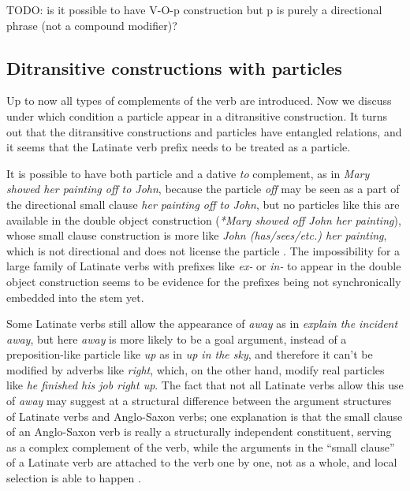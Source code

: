 \documentclass[UTF8, a4paper, oneside, scheme=plain, 12pt]{ctexbook}
\newcommand{\form}[1]{\emph{#1}}
\begin{document}
TODO: is it possible to have V-O-p construction but p is purely a directional phrase (not a compound modifier)?

\subsection{Ditransitive constructions with particles}\label{sec:clause.ditransitive-particle}

Up to now all types of complements of the verb are introduced.
Now we discuss under which condition a particle appear in a ditransitive construction. 
It turns out that
the ditransitive constructions and particles have entangled relations, 
and it seems that the Latinate verb prefix needs to be treated as a particle.

It is possible to have both particle and a dative \form{to} complement, 
as in \form{Mary showed her painting off to John}, 
because the particle \form{off} may be seen as a part 
of the directional small clause \form{her painting off to John}, 
but no particles like this are available in the double object construction
(\form{*Mary showed off John her painting}),
whose small clause construction is more like \form{John (has/sees/etc.) her painting},
which is not directional and does not license the particle \citep{harley2007bipartite}.
The impossibility for a large family of Latinate verbs 
with prefixes like \form{ex-} or \form{in-}
to appear in the double object construction 
seems to be evidence for the prefixes being not synchronically embedded into the stem yet.

Some Latinate verbs still allow the appearance of \form{away} 
as in \form{explain the incident away}, 
but here \form{away} is more likely to be a goal argument, 
instead of a preposition-like particle like \form{up} as in \form{up in the sky}, 
and therefore it can't be modified by adverbs like \form{right},
which, on the other hand, modify real particles like \form{he finished his job right up}.
The fact that not all Latinate verbs allow this use of \form{away} 
may suggest at a structural difference between the argument structures 
of Latinate verbs and Anglo-Saxon verbs;
one explanation is that the small clause of an Anglo-Saxon verb 
is really a structurally independent constituent, 
serving as a complex complement of the verb, 
while the arguments in the ``small clause'' of a Latinate verb 
are attached to the verb one by one, not as a whole, 
and local selection is able to happen \citep{punske2013three}.
\end{document}
